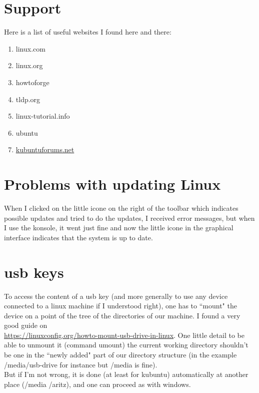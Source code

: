 \documentclass[11pt,a4paper]{article} %
\begin{document}
\section{Support}
Here is a list of useful websites I found here and there:
\begin{enumerate}
\item linux.com
\item linux.org
\item howtoforge
\item tldp.org
\item linux-tutorial.info
\item ubuntu
\item \href{https://www.kubuntuforums.net/forum.php}{kubuntuforums.net}
\end{enumerate}

\section{Problems with updating Linux}
When I clicked on the little icone on the right of the toolbar which indicates possible updates and tried to do the updates, I received error messages, but when I use the konsole, it went just fine and now the little icone in the graphical interface indicates that the system is up to date.

\section{usb keys}
To access the content of a usb key (and more generally to use any device connected to a linux machine if I understood right), one has to ``mount" the device on a point of the tree of the directories of our machine. I found a very good guide on\\ \url{https://linuxconfig.org/howto-mount-usb-drive-in-linux}.
One little detail to be able to unmount it (command umount) the current working directory shouldn't be one in the ``newly added" part of our directory structure (in the example \slash media\slash usb-drive for instance but \slash media is fine).\\
But if I'm not wrong, it is done (at least for kubuntu) automatically at another place (\slash media \slash aritz), and one can proceed as with windows.
\end{document}
